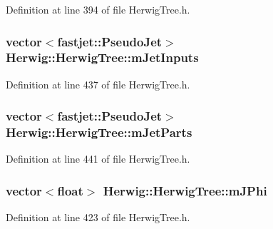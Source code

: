 Definition at line 394 of file Herwig\+Tree.\+h.

\subsubsection[{\texorpdfstring{m\+Jet\+Inputs}{mJetInputs}}]{\setlength{\rightskip}{0pt plus 5cm}vector$<$fastjet\+::\+Pseudo\+Jet$>$ Herwig\+::\+Herwig\+Tree\+::m\+Jet\+Inputs\hspace{0.3cm}{\ttfamily [protected]}}\hypertarget{class_herwig_1_1_herwig_tree_a22ebbb6eef9ef80f746f683008abb301}{}\label{class_herwig_1_1_herwig_tree_a22ebbb6eef9ef80f746f683008abb301}


Definition at line 437 of file Herwig\+Tree.\+h.

\subsubsection[{\texorpdfstring{m\+Jet\+Parts}{mJetParts}}]{\setlength{\rightskip}{0pt plus 5cm}vector$<$fastjet\+::\+Pseudo\+Jet$>$ Herwig\+::\+Herwig\+Tree\+::m\+Jet\+Parts\hspace{0.3cm}{\ttfamily [protected]}}\hypertarget{class_herwig_1_1_herwig_tree_a19bee8df38df5b5fffd77dd75d4ae956}{}\label{class_herwig_1_1_herwig_tree_a19bee8df38df5b5fffd77dd75d4ae956}


Definition at line 441 of file Herwig\+Tree.\+h.

\subsubsection[{\texorpdfstring{m\+J\+Phi}{mJPhi}}]{\setlength{\rightskip}{0pt plus 5cm}vector$<$float$>$ Herwig\+::\+Herwig\+Tree\+::m\+J\+Phi\hspace{0.3cm}{\ttfamily [protected]}}\hypertarget{class_herwig_1_1_herwig_tree_ae5fb619ee4d7c58f7f6d71d99392dd5b}{}\label{class_herwig_1_1_herwig_tree_ae5fb619ee4d7c58f7f6d71d99392dd5b}


Definition at line 423 of file Herwig\+Tree.\+h.


